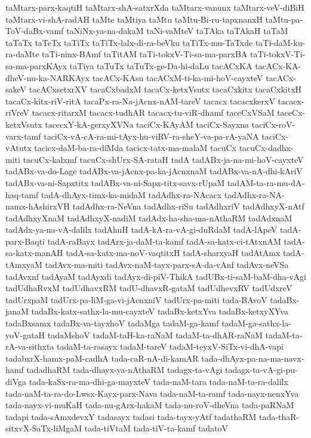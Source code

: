 {taMtarx-parx-kaqtiH
taMtarx-shA-satxrXda
taMtarx-vanunx
taMtarx-veV-diBiH
taMtarx-vi-shA-radAH
taMte
taMtiya
taMtu
taMtu-Bi-ru-tapxnanxH
taMtu-pa-ToV-daBx-vamf
taNiNx-ya-na-dakaM
taNi-vaMteV
taTAka
taTAkaH
taTaM
taTaTx
taTeTx
taTiTx
taTiTx-lalx-di-ra-beVku
taTiTx-mu-TaTxde
taTi-daM-ku-ra-daMte
taTi-ninx-BAmf
taTitAM
taTi-tokxV-Ti-sa-ma-parxBA
taTi-tokxV-Ti-sa-ma-parxKAyx
taTiya
taTuTx
taTuTx-ge-Da-hi-daLu
tacACxKA
tacACx-KA-dheV-nu-ka-NARKAyx
tacACx-KAsu
tacACxM-ti-ka-mi-hoV-cayxteV
tacACx-sakeV
tacACxsetxrXV
tacaCxbadxM
tacaCx-ketxVsutx
tacaCxkitx
tacaCxkitxH
tacaCx-kitx-riV-ritA
tacaPx-ra-Na-jAcnx-nAM-tareV
tacacx
tacacxkerxV
tacacx-riVreV
tacacx-ritarxM
tacacx-tudhAR
tacacx-tu-viR-dhamf
taceCxVSaM
taceCx-ketxVsutx
tacecxY-kA-gerxyXVNa
taciCx-KAyAM
taciCx-Sayxna
taciCx-roV-varx-tamf
taciCx-vA-cA-ra-mi-tAyx-hu-viRV-ra-sheY-va-pa-rA-yaNA
taciCx-vAtutx
tacicx-daM-ba-ra-diMda
tacicx-tatx-ma-malaM
tacuCx
tacuCx-dadhx-miti
tacuCx-kalxmf
tacuCx-shUrx-SA-rataH
tadA
tadABx-ja-na-mi-hoV-cayxteV
tadABx-va-do-Lage
tadABx-va-jAcnx-pa-ka-jAcnxnaM
tadABx-va-nA-dhi-kAriV
tadABx-va-ni-Sapxtitx
tadABx-va-ni-Sapx-titx-savx-rUpaM
tadAM-ta-ra-mu-dA-haq-tamf
tadA-dhAyx-timx-ka-midaM
tadAdhx-ra-NAcacx
tadAdhx-ra-NA-namx-hAshirxVH
tadAdhx-ra-NeVna
tadAdhx-riSu
tadAdhxriV
tadAdhxyX-nAtf
tadAdhxyXnaM
tadAdhxyX-nadiM
tadAdx-ha-sha-ma-nAthaRM
tadAdxnaM
tadAdx-ya-na-vA-dalilx
tadAhuH
tadA-kA-ra-vA-gi-duRdaM
tadA-lApeV
tadA-parx-Baqti
tadA-raBayx
tadArx-ja-daM-ta-kamf
tadA-sa-katx-ci-tAtxnAM
tadA-sa-katx-manAH
tadA-sa-katx-ma-noV-vaqtitxH
tadA-sharxyaH
tadAtAmx
tadA-tAmxyaM
tadAvx-ma-miti
tadAvx-naM-tayx-parx-sA-da-vAnf
tadAvx-neVSa
tadAvxnf
tadAyaM
tadAyxdi
tadAyx-di-piV-ThikA
tadUBx-ti-saM-baM-dha-vAgi
tadUdhaRvxM
tadUdhavxRM
tadU-dhavxR-gataM
tadUdhevxRV
tadUdxreV
tadUrxpaM
tadUrx-pa-liM-ga-vi-jAcnxniV
tadUrx-pa-miti
tada-BAvoV
tadaBx-janaM
tadaBx-katx-sathx-la-mu-cayxteV
tadaBx-ketxYva
tadaBx-ketxyXYva
tadaBxsamx
tadaBx-va-tayxhoV
tadaMga
tadaM-ga-kamf
tadaM-ga-sathx-la-yoV-gataH
tadaMshoV
tadaM-taH-ka-raNaM
tadaM-ta-dhAR-raNaM
tadaM-ta-rA-va-sithxta
tadaM-ta-rasayx
tadaM-tareV
tadaM-teyxV-SiTx-vi-dhA-vapi
tadabxrX-hamx-paM-cadhA
tada-caR-nA-di-kamAR
tada-dhAyx-pa-na-ma-navx-hamf
tadadhaRM
tada-dhayx-ya-nAthaRM
tadagx-ta-vAgi
tadagx-ta-vA-gi-pu-diVga
tada-kaSx-ra-ma-dhi-ga-mayxteV
tada-naM-tara
tada-naM-ta-ra-dalilx
tada-naM-ta-ra-do-Lwsx-Kayx-parx-Nava
tada-naM-ta-ramf
tada-nayx-nenxYva
tada-nayx-vi-muKaH
tada-nu-gArx-hakaM
tada-nu-roV-dheVna
tada-paRNaM
tadapi
tada-sAmxdevxY
tadasayx
tadasi
tada-tayx-yAtf
tadathaRM
tada-thaR-sitxvX-SaTx-liMgaM
tada-tiVtaM
tada-tiV-ta-kamf
tadatoV
}
